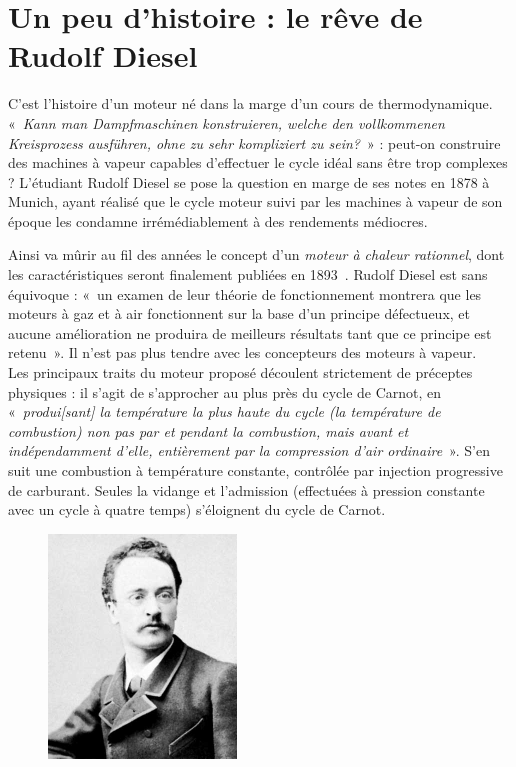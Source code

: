\atstartofhistorysection
\section[Un peu d’histoire : le rêve de Rudolf Diesel]{Un peu d’histoire :\onlyamphibook{\\} le rêve de Rudolf Diesel}
\label{ch_histoire_diesel}

	C’est l’histoire d’un moteur né dans la marge d’un cours de thermodynamique. «~\textit{Kann man Dampfmaschinen konstruieren, welche den vollkommenen Kreisprozess ausführen, ohne zu sehr kompliziert zu sein?}~» : peut-on construire des machines à vapeur capables d’effectuer le cycle idéal sans être trop complexes ? L’étudiant \mbox{Rudolf} Diesel se pose la question en marge de ses notes en 1878 à Munich, ayant réalisé que le cycle moteur suivi par les machines à vapeur de son époque les condamne irrémédiablement à des rendements médiocres.

	Ainsi va mûrir au fil des années le concept d’un \textit{moteur à chaleur rationnel}, dont les caractéristiques seront finalement publiées en 1893~\cite{diesel1893, diesel1893en}. Rudolf Diesel est sans équivoque : «~un examen de leur théorie de fonctionnement montrera que les moteurs à gaz et à air fonctionnent sur la base d’un principe défectueux, et aucune amélioration ne produira de meilleurs résultats tant que ce principe est retenu~». Il n’est pas plus tendre avec les concepteurs des moteurs à vapeur.\\
	Les principaux traits du moteur proposé découlent strictement de préceptes physiques : il s’agit de s’approcher au plus près du cycle de Carnot, en «~\textit{produi[sant] la température la plus haute du cycle (la température de combustion) non pas par et pendant la combustion, mais avant et indépendamment d’elle, entièrement par la compression d’air ordinaire}~». S’en suit une combustion à température constante, contrôlée par injection progressive de carburant. Seules la vidange et l’admission (effectuées à pression constante avec un cycle à quatre temps) s’éloignent du cycle de Carnot.
	
	\begin{figure}
		\begin{center}
			\includegraphics[width=5cm]{images/rudolf_diesel_1883.jpg}
		\end{center}
		\label{fig_rudolf_diesel}
	\end{figure}
	
